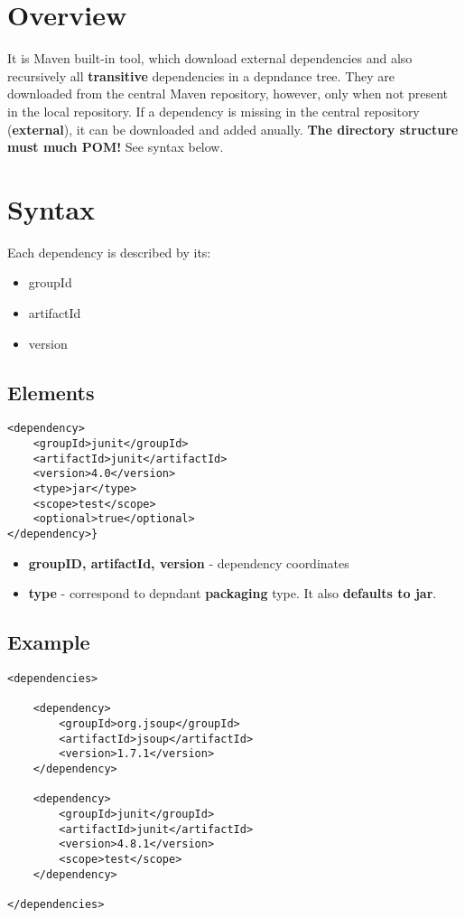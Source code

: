\documentclass{report}
\begin{document}
\chapter{Overview}
It is Maven built-in tool, which download external dependencies and also recursively all \textbf{transitive} dependencies in a depndance tree. They are downloaded
from the central Maven repository, however, only when not present in the local repository. If a dependency is missing in the central repository
(\textbf{external}), it can be downloaded and added
anually. \textbf{The directory structure must much POM!} See syntax below.



\chapter{Syntax}
Each dependency is described by its:
\begin{itemize}
	\item groupId
	\item artifactId
	\item version
\end{itemize}


\section{Elements}
\begin{verbatim}
<dependency>
    <groupId>junit</groupId>
    <artifactId>junit</artifactId>
    <version>4.0</version>
    <type>jar</type>
    <scope>test</scope>
    <optional>true</optional>
</dependency>}
\end{verbatim}
\begin{itemize}
	\item \textbf{groupID, artifactId, version} - dependency coordinates
	\item \textbf{type} - correspond to depndant \textbf{packaging} type. It also \textbf{defaults to jar}.
\end{itemize}


\section{Example}

\begin{verbatim}
<dependencies>

    <dependency>
        <groupId>org.jsoup</groupId>
        <artifactId>jsoup</artifactId>
        <version>1.7.1</version>
    </dependency>

    <dependency>
        <groupId>junit</groupId>
        <artifactId>junit</artifactId>
        <version>4.8.1</version>
        <scope>test</scope>
    </dependency>

</dependencies>
\end{verbatim}
\end{document}
